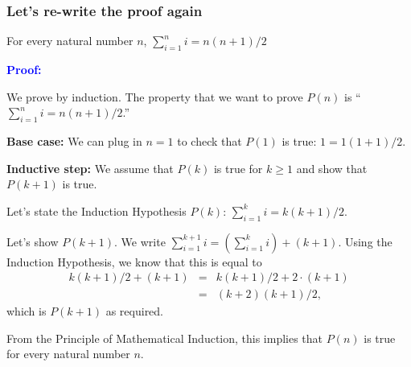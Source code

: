 \begin{frame}\frametitle{Let's re-write the proof again}
  \begin{theorem}
    For every natural number $n$, $\sum_{i=1}^n i = n(n+1)/2$
  \end{theorem}
  {\bf \textcolor{blue}{Proof:}}{\small
    We prove by induction.  The property that we want to prove $P(n)$
    is ``$\sum_{i=1}^n i = n(n+1)/2$.''

    {\bf Base case:} We can plug in $n=1$ to check that $P(1)$ is
    true: $1 = 1(1+1)/2$.

    {\bf Inductive step:} We assume that $P(k)$ is true for $k\geq 1$
    and show that $P(k+1)$ is true.

    Let's state the Induction Hypothesis $P(k)$:
    $ \sum_{i=1}^k i = k(k+1)/2.$

    Let's show $P(k+1)$.  We write
    $ \sum_{i=1}^{k+1} i = \left(\sum_{i=1}^k i\right) + (k+1) .$
    Using the Induction Hypothesis, we know that this is equal to
    \begin{eqnarray*}
      k(k+1)/2 + (k+1) &=& k(k+1)/2 + 2\cdot(k+1)\\
      &=& (k+2)(k+1)/2,
    \end{eqnarray*}
    which is $P(k+1)$ as required.

    From the Principle of Mathematical Induction, this implies that
    $P(n)$ is true for every natural number $n$.
  }
\end{frame}
